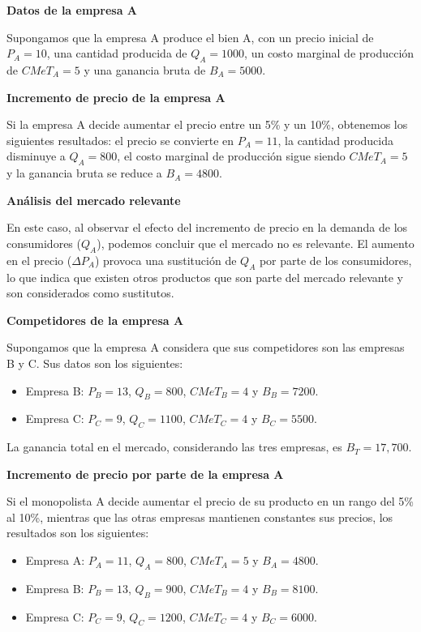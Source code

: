 \documentclass[
  a4paper,
]{article}
\providecommand{\tightlist}{%
  \setlength{\itemsep}{0pt}\setlength{\parskip}{0pt}}\usepackage{longtable,booktabs,array}
\begin{document}
\textbf{Datos de la empresa A}

Supongamos que la empresa A produce el bien A, con un precio inicial de
\(P_A = 10\), una cantidad producida de \(Q_A = 1000\), un costo
marginal de producción de \(CMeT_A = 5\) y una ganancia bruta de
\(B_A = 5000\).

\textbf{Incremento de precio de la empresa A}

Si la empresa A decide aumentar el precio entre un 5\% y un 10\%,
obtenemos los siguientes resultados: el precio se convierte en
\(P_A = 11\), la cantidad producida disminuye a \(Q_A = 800\), el costo
marginal de producción sigue siendo \(CMeT_A = 5\) y la ganancia bruta
se reduce a \(B_A = 4800\).

\textbf{Análisis del mercado relevante}

En este caso, al observar el efecto del incremento de precio en la
demanda de los consumidores (\(Q_A\)), podemos concluir que el mercado
no es relevante. El aumento en el precio (\(\Delta P_A\)) provoca una
sustitución de \(Q_A\) por parte de los consumidores, lo que indica que
existen otros productos que son parte del mercado relevante y son
considerados como sustitutos.

\textbf{Competidores de la empresa A}

Supongamos que la empresa A considera que sus competidores son las
empresas B y C. Sus datos son los siguientes:

\begin{itemize}
\tightlist
\item
  Empresa B: \(P_B = 13\), \(Q_B = 800\), \(CMeT_B = 4\) y
  \(B_B = 7200\).
\item
  Empresa C: \(P_C = 9\), \(Q_C = 1100\), \(CMeT_C = 4\) y
  \(B_C = 5500\).
\end{itemize}

La ganancia total en el mercado, considerando las tres empresas, es
\(B_T = 17,700\).

\textbf{Incremento de precio por parte de la empresa A}

Si el monopolista A decide aumentar el precio de su producto en un rango
del 5\% al 10\%, mientras que las otras empresas mantienen constantes
sus precios, los resultados son los siguientes:

\begin{itemize}
\tightlist
\item
  Empresa A: \(P_A = 11\), \(Q_A = 800\), \(CMeT_A = 5\) y
  \(B_A = 4800\).
\item
  Empresa B: \(P_B = 13\), \(Q_B = 900\), \(CMeT_B = 4\) y
  \(B_B = 8100\).
\item
  Empresa C: \(P_C = 9\), \(Q_C = 1200\), \(CMeT_C = 4\) y
  \(B_C = 6000\).
\end{itemize}
\end{document}
